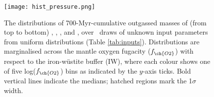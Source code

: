 \begin{figure}
\centering
  \texttt{[image: hist\_pressure.png]}
\caption[Distributions of cumulative outgassed masses of , , , and , over uniformly-random draws of unknown input parameters.]{The distributions of 700-Myr-cumulative outgassed masses of (from top to bottom) , , , and , over \Ncases~draws of unknown input parameters from uniform distributions (Table \ref{tab:inputs}). Distributions are marginalised across the mantle oxygen fugacity ($f_{\ch{O2}}$) with respect to the iron-w\"ustite buffer (IW), where each colour shows one of five log($f_{\ch{O2}}$) bins as indicated by the $y$-axis ticks. Bold vertical lines indicate the medians; hatched regions mark the 1$\sigma$ width.\label{fig:hist_mass_fo2}}
\end{figure}




